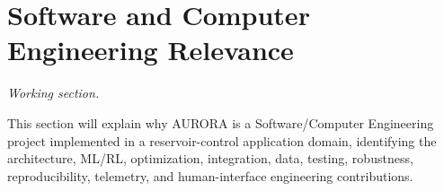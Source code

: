 \section{Software and Computer Engineering Relevance}
\label{sec:program-relevance}

\textit{Working section.}

This section will explain why AURORA is a Software/Computer Engineering project
implemented in a reservoir-control application domain, identifying the architecture,
ML/RL, optimization, integration, data, testing, robustness, reproducibility,
telemetry, and human-interface engineering contributions.
